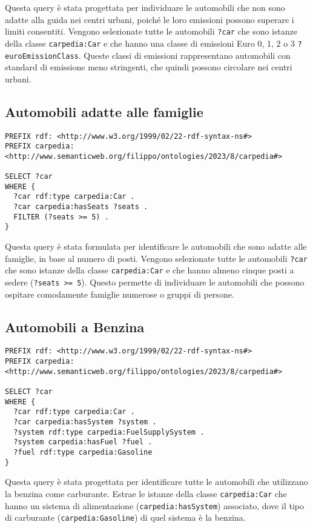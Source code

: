 Questa query è stata progettata per individuare le automobili che non sono adatte alla guida nei centri urbani,
poiché le loro emissioni possono superare i limiti consentiti.
Vengono selezionate tutte le automobili \texttt{?car} che sono istanze della classe \texttt{carpedia:Car} e che hanno una classe di emissioni Euro 0, 1, 2 o 3 \texttt{?euroEmissionClass}.
Queste classi di emissioni rappresentano automobili con standard di emissione meno stringenti, che quindi possono circolare nei centri urbani.

\subsection{Automobili adatte alle famiglie}

\begin{lstlisting}[language=SPARQL]
PREFIX rdf: <http://www.w3.org/1999/02/22-rdf-syntax-ns#>
PREFIX carpedia: <http://www.semanticweb.org/filippo/ontologies/2023/8/carpedia#>

SELECT ?car
WHERE {
  ?car rdf:type carpedia:Car .
  ?car carpedia:hasSeats ?seats .
  FILTER (?seats >= 5) .
}
\end{lstlisting}


Questa query è stata formulata per identificare le automobili che sono adatte alle famiglie, in base al numero
di posti. Vengono selezionate tutte le automobili \texttt{?car} che sono istanze della classe \texttt{carpedia:Car} e
che hanno almeno cinque posti a sedere (\texttt{?seats >= 5}). Questo permette di individuare le automobili che possono ospitare comodamente famiglie numerose o gruppi di persone.

\break

\subsection{Automobili a Benzina}

\begin{lstlisting}[language=SPARQL]
PREFIX rdf: <http://www.w3.org/1999/02/22-rdf-syntax-ns#>
PREFIX carpedia: <http://www.semanticweb.org/filippo/ontologies/2023/8/carpedia#>

SELECT ?car
WHERE {
  ?car rdf:type carpedia:Car .
  ?car carpedia:hasSystem ?system .
  ?system rdf:type carpedia:FuelSupplySystem .
  ?system carpedia:hasFuel ?fuel .
  ?fuel rdf:type carpedia:Gasoline
}
\end{lstlisting}


Questa query è stata progettata per identificare tutte le automobili che utilizzano la benzina come carburante.
Estrae le istanze della classe \texttt{carpedia:Car} che hanno un sistema di alimentazione (\texttt{carpedia:hasSystem}) associato, dove il tipo di carburante (\texttt{carpedia:Gasoline}) di quel sistema è la benzina.

